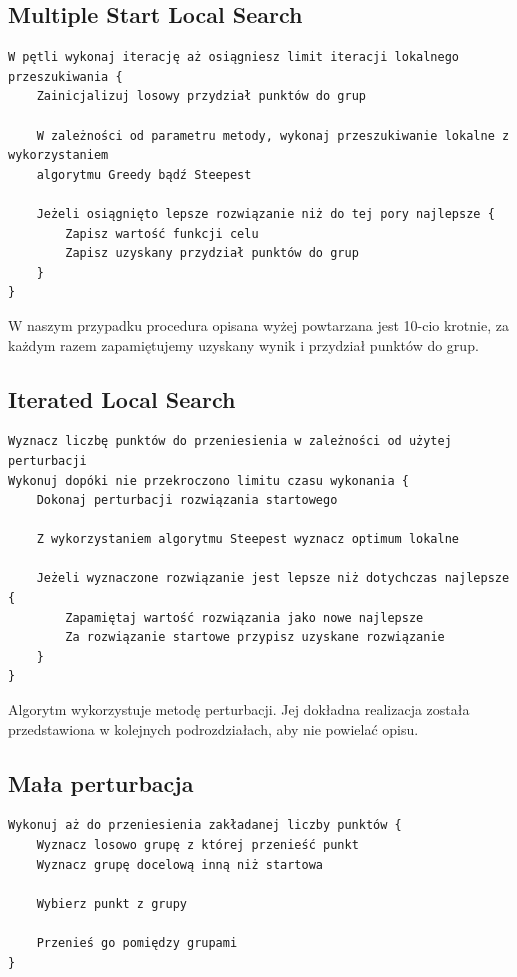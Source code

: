 \documentclass[main.tex]{subfiles}
\begin{document}
\subsection{Multiple Start Local Search}
\begin{verbatim}
W pętli wykonaj iterację aż osiągniesz limit iteracji lokalnego przeszukiwania {
    Zainicjalizuj losowy przydział punktów do grup

    W zależności od parametru metody, wykonaj przeszukiwanie lokalne z wykorzystaniem
    algorytmu Greedy bądź Steepest

    Jeżeli osiągnięto lepsze rozwiązanie niż do tej pory najlepsze {
        Zapisz wartość funkcji celu
        Zapisz uzyskany przydział punktów do grup
    }
}
\end{verbatim}
W naszym przypadku procedura opisana wyżej powtarzana jest 10-cio krotnie, za każdym razem zapamiętujemy uzyskany wynik i przydział punktów do grup.

\subsection{Iterated Local Search}
\begin{verbatim}
Wyznacz liczbę punktów do przeniesienia w zależności od użytej perturbacji
Wykonuj dopóki nie przekroczono limitu czasu wykonania {
    Dokonaj perturbacji rozwiązania startowego

    Z wykorzystaniem algorytmu Steepest wyznacz optimum lokalne

    Jeżeli wyznaczone rozwiązanie jest lepsze niż dotychczas najlepsze {
        Zapamiętaj wartość rozwiązania jako nowe najlepsze
        Za rozwiązanie startowe przypisz uzyskane rozwiązanie
    }
}
\end{verbatim}
Algorytm wykorzystuje metodę perturbacji. Jej dokładna realizacja została przedstawiona w kolejnych podrozdziałach, aby nie powielać opisu.

\subsection{Mała perturbacja}
\begin{verbatim}
Wykonuj aż do przeniesienia zakładanej liczby punktów {
    Wyznacz losowo grupę z której przenieść punkt
    Wyznacz grupę docelową inną niż startowa

    Wybierz punkt z grupy

    Przenieś go pomiędzy grupami
}
\end{verbatim}
\end{document}
